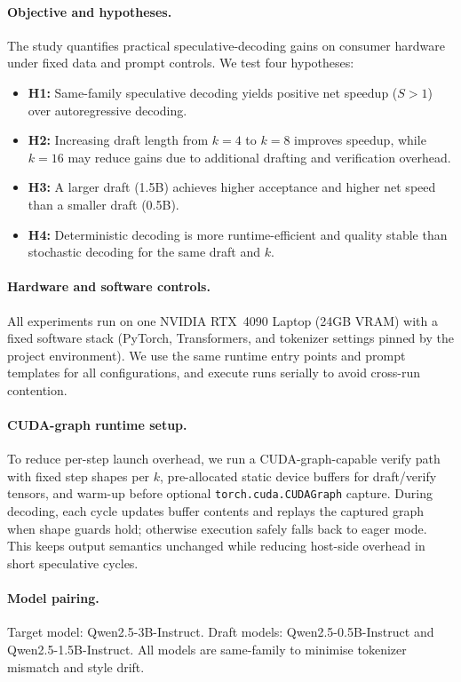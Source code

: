 \paragraph{Objective and hypotheses.}
The study quantifies practical speculative-decoding gains on consumer hardware
under fixed data and prompt controls.
We test four hypotheses:
\begin{itemize}
    \item \textbf{H1:} Same-family speculative decoding yields positive net speedup
        ($S>1$) over autoregressive decoding.
    \item \textbf{H2:} Increasing draft length from $k{=}4$ to $k{=}8$ improves
        speedup, while $k{=}16$ may reduce gains due to additional drafting
        and verification overhead.
    \item \textbf{H3:} A larger draft (1.5B) achieves higher acceptance and higher
        net speed than a smaller draft (0.5B).
    \item \textbf{H4:} Deterministic decoding is more runtime-efficient and quality
        stable than stochastic decoding for the same draft and $k$.
\end{itemize}

\paragraph{Hardware and software controls.}
All experiments run on one NVIDIA RTX~4090 Laptop (24GB VRAM) with a fixed software
stack (PyTorch, Transformers, and tokenizer settings pinned by the project
environment). We use the same runtime entry points and prompt templates for
all configurations, and execute runs serially to avoid cross-run contention.

\paragraph{CUDA-graph runtime setup.}
To reduce per-step launch overhead, we run a CUDA-graph-capable verify path
with fixed step shapes per $k$, pre-allocated static device buffers for
draft/verify tensors, and warm-up before optional
\texttt{torch.cuda.CUDAGraph} capture. During decoding, each cycle updates
buffer contents and replays the captured graph when shape guards hold;
otherwise execution safely falls back to eager mode. This keeps output
semantics unchanged while reducing host-side overhead in short speculative
cycles.

\paragraph{Model pairing.}
Target model: Qwen2.5-3B-Instruct.
Draft models: Qwen2.5-0.5B-Instruct and Qwen2.5-1.5B-Instruct.
All models are same-family to minimise tokenizer mismatch and style drift.

